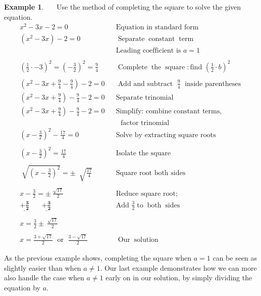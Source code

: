 \documentclass[12pt]{book}
\theoremstyle{definition}
\newtheorem{example}{Example}
\newcommand{\tmmathbf}[1]{\ensuremath{\boldsymbol{#1}}}
\newcommand{\tmop}[1]{\ensuremath{\operatorname{#1}}}
\begin{document}
\begin{example}~~~Use the method of completing the square to solve the given equation.
  \begin{eqnarray*}
    x^2-3x-2 = 0 &  & \text{Equation~in~standard~form}\\
    (x^2 -3x)-2=0 &  & \tmop{Separate} \tmop{constant} \tmop{term}\\
    &  & \text{Leading~coefficient~is~} a=1\\
    &&\\
		\left( \frac{1}{2} \cdot -3 \right)^2 = \left(-\frac{3}{2}\right)^2 = \frac{9}{4} &  & \tmop{Complete}
    \tmop{the} \tmop{square} : \text{find~}\left( \frac{1}{2} \cdot b \right)^2\\
    &&\\
		\left(x^2 -3x+\frac{9}{4}-\frac{9}{4}\right)-2=0 &  & \tmop{Add~and~subtract~} \frac{9}{4}
    \tmop{~inside~parentheses}\\
    \left(x^2 -3x+\frac{9}{4}\right)-\frac{9}{4}-2=0 &  & \tmop{Separate~trinomial}\\
    \left(x^2 -3x+\frac{9}{4}\right)-\frac{9}{4}-2=0 &  & \text{Simplify:~combine~constant~terms,}\\
		& & ~~~\text{factor~trinomial}\\
		\left(x - \frac{3}{2}\right)^2 -\frac{17}{4}= 0&&\tmop{Solve~by~extracting~square~roots}\\
    &&\\
		\left(x - \frac{3}{2}\right)^2 =\frac{17}{4}&&\tmop{Isolate~the~square}\\
		&&\\
		\sqrt[]{\left(x - \frac{3}{2}\right)^2} = \pm~ \sqrt[]{\frac{17}{4}} &  & \tmop{Square~root~both~sides}\\
    &&\\
		x - \frac{3}{2} = \pm~ \frac{\sqrt{17}}{2} &  & \tmop{Reduce~square~root;}\\
		\tmmathbf{\underline{+ \frac{3}{2}}~~~~~~~~\underline{+ \frac{3}{2}}}  && \text{Add~} \frac{3}{2} \tmop{to} \tmop{both} \tmop{sides}\\
    &&\\
		x = \frac{3}{2}\pm~ \frac{\sqrt{17}}{2}&  &\\
    &&\\
		x = \frac{3+\sqrt{17}}{2} \tmop{~or~} \frac{3-\sqrt{17}}{2} &  & \tmop{Our} \tmop{solution}
  \end{eqnarray*}
\end{example}
As the previous example shows, completing the square when $a=1$ can be seen as slightly easier than when $a\neq 1$.  Our last example demonstrates how we can more also handle the case when $a\neq 1$ early on in our solution, by simply dividing the equation by $a$.
\end{document}

